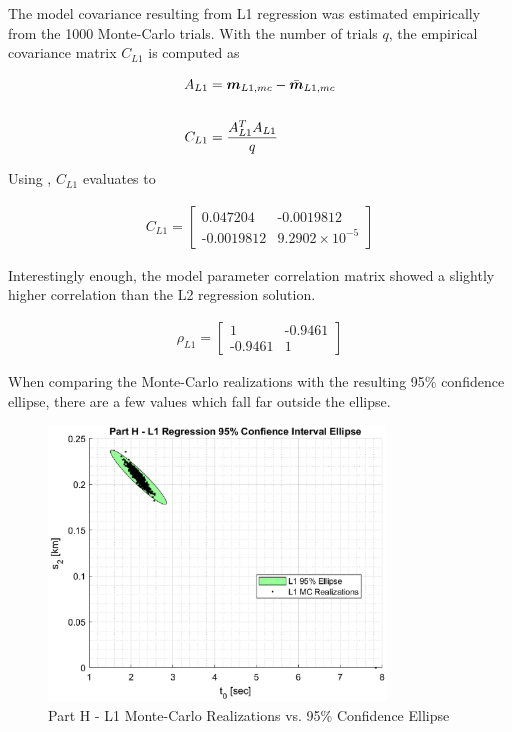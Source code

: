 The model covariance resulting from L1 regression was estimated empirically from the 1000 Monte-Carlo trials. With the number of trials $q$, the empirical covariance matrix $C_{L1}$ is computed as

\begin{align*}
	A_{L1} &= \boldsymbol{m}_{L1,mc} - \bar{\boldsymbol{m}}_{L1,mc} \\
	\\
	C_{L1} &= \frac{A_{L1}^T A_{L1}}{q}
\end{align*}

Using \MATLAB, $C_{L1}$ evaluates to

\begin{align*}
	C_{L1} = \begin{bmatrix} \textrm{0.047204} & \textrm{-0.0019812} \\ \textrm{-0.0019812} & \textrm{9.2902} \times 10^{-5} \end{bmatrix}
\end{align*}

Interestingly enough, the model parameter correlation matrix showed a slightly higher correlation than the L2 regression solution. 

\begin{align*}
	\rho_{L1} = \begin{bmatrix} \textrm{1} & \textrm{-0.9461} \\ \textrm{-0.9461} & \textrm{1} \end{bmatrix}
\end{align*}

When comparing the Monte-Carlo realizations with the resulting 95\% confidence ellipse, there are a few values which fall far outside the ellipse. 

 \begin{figure}[h] 
 	\centering
 	\includegraphics[width=0.8\textwidth]{./images/prob1_partH.eps}
 	\caption{Part H - L1 Monte-Carlo Realizations vs. 95\% Confidence Ellipse}
 	\label{fig: prob1 partH}
 \end{figure}
 \FloatBarrier
 
